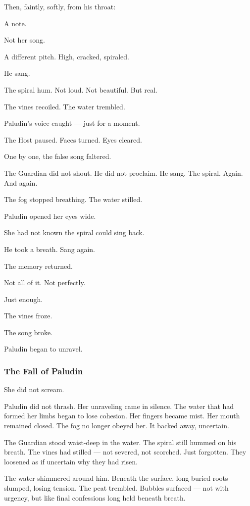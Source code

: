 \documentclass[12pt]{article}
\begin{document}
Then, faintly, softly, from his throat:

A note.

Not her song.

A different pitch. High, cracked, spiraled.

He sang.

The spiral hum. Not loud. Not beautiful. But real.

The vines recoiled. The water trembled.

Paludin’s voice caught — just for a moment.

The Host paused. Faces turned. Eyes cleared.

One by one, the false song faltered.

The Guardian did not shout. He did not proclaim. He sang. The spiral. Again. And again.

The fog stopped breathing. The water stilled.

Paludin opened her eyes wide.

She had not known the spiral could sing back.

He took a breath. Sang again.

The memory returned.

Not all of it. Not perfectly.

Just enough.

The vines froze.

The song broke.

Paludin began to unravel.

\dotfill

\subsubsection*{The Fall of Paludin}

She did not scream.

Paludin did not thrash. Her unraveling came in silence. The water that had formed her limbs began to lose cohesion. Her fingers became mist. Her mouth remained closed. The fog no longer obeyed her. It backed away, uncertain.

The Guardian stood waist-deep in the water. The spiral still hummed on his breath. The vines had stilled — not severed, not scorched. Just forgotten. They loosened as if uncertain why they had risen.

The water shimmered around him. Beneath the surface, long-buried roots slumped, losing tension. The peat trembled. Bubbles surfaced — not with urgency, but like final confessions long held beneath breath.
\end{document}
